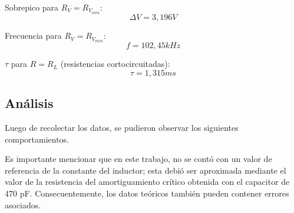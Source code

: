 \documentclass{article}
\begin{document}
                Sobrepico para $ R_V = R_{V_{min}} $:
                \begin{equation*}
                    \Delta V = 3,196 V
                \end{equation*} \par

                Frecuencia para $ R_V = R_{V_{min}} $:
                \begin{equation*}
                    f = 102,45 kHz
                \end{equation*} \par

                $ \tau $ para $ R = R_L $ (resistencias cortocircuitadas):
                \begin{equation*}
                    \tau =  1,315 ms 
                \end{equation*}
        


    \subsection{Análisis}
    
    	Luego de recolectar los datos, se pudieron observar los siguientes comportamientos. \par
	Es importante mencionar que en este trabajo, no se contó con un valor de referencia de la constante del inductor; esta debió ser aproximada mediante el valor de la resistencia del amortiguamiento crítico obtenida con el capacitor de 470 pF. Consecuentemente, los datos teóricos también pueden contener errores asociados.
	
\end{document}

